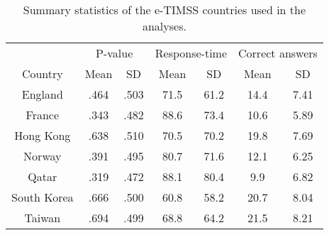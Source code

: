 \documentclass{interact}
\begin{document}
\begin{table}[H]
\caption{\label{tab:Country summary statistics}\\ Summary statistics of the e-TIMSS countries used in the analyses.}
\begin{tabular}{c|c c c c c c}
\hline
    & \multicolumn{2}{c}{P-value} & \multicolumn{2}{c}{Response-time} & \multicolumn{2}{c}{Correct answers}\\
    Country & Mean & SD & Mean & SD & Mean & SD \\
    \hline
    England & .464 & .503 & 71.5 & 61.2 & 14.4 & 7.41 \\
    France & .343 & .482 & 88.6 & 73.4 & 10.6 & 5.89 \\
    Hong Kong & .638 & .510 & 70.5 & 70.2 & 19.8 & 7.69 \\
    Norway & .391 & .495 & 80.7 & 71.6 & 12.1 & 6.25 \\
    Qatar & .319 & .472 & 88.1 & 80.4 & 9.9 & 6.82 \\
    South Korea & .666 & .500 & 60.8 & 58.2 & 20.7 & 8.04 \\
    Taiwan & .694 & .499 & 68.8 & 64.2 & 21.5 & 8.21 \\
    \hline
\end{tabular}
\end{table}
\end{document}
